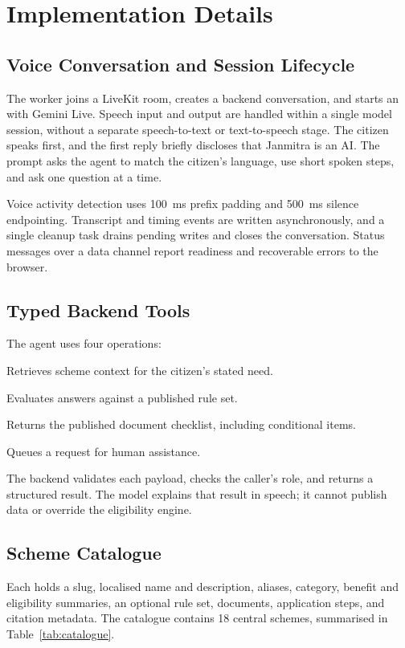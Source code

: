 \documentclass[11pt,a4paper,oneside]{report}
\newcommand{\code}[1]{\texttt{\detokenize{#1}}}
\begin{document}
\section{Implementation Details}

\subsection{Voice Conversation and Session Lifecycle}
The worker joins a LiveKit room, creates a backend conversation, and starts an
\code{AgentSession} with Gemini Live. Speech input and output are handled within a
single model session, without a separate speech-to-text or text-to-speech stage.
The citizen speaks first, and the first reply briefly discloses that Janmitra is
an AI. The prompt asks the agent to match the citizen's language, use short spoken
steps, and ask one question at a time.

Voice activity detection uses 100~ms prefix padding and 500~ms silence
endpointing. Transcript and timing events are written asynchronously, and a single
cleanup task drains pending writes and closes the conversation. Status messages
over a data channel report readiness and recoverable errors to the browser.

\subsection{Typed Backend Tools}
The agent uses four operations:
\begin{description}[leftmargin=1.7em,style=nextline]
  \item[\code{find_service}] Retrieves scheme context for the citizen's stated need.
  \item[\code{check_eligibility}] Evaluates answers against a published rule set.
  \item[\code{get_documents}] Returns the published document checklist, including
    conditional items.
  \item[\code{request_handoff}] Queues a request for human assistance.
\end{description}
The backend validates each payload, checks the caller's role, and returns a
structured result. The model explains that result in speech; it cannot publish
data or override the eligibility engine.

\subsection{Scheme Catalogue}
Each \code{ServiceRecord} holds a slug, localised name and description, aliases,
category, benefit and eligibility summaries, an optional rule set, documents,
application steps, and citation metadata. The catalogue contains 18 central
schemes, summarised in Table~\ref{tab:catalogue}.
\end{document}
